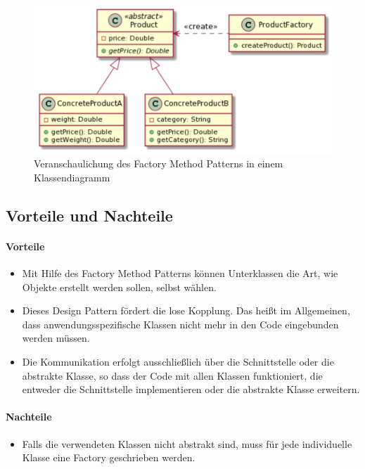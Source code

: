 \begin{figure}[H]
\begin{center}
	\includegraphics[scale=.7]{images/cld_factory_pattern.png}
\end{center}
	\caption{Veranschaulichung des Factory Method Patterns in einem Klassendiagramm}
\end{figure}

\subsection{Vorteile und Nachteile}
\paragraph{Vorteile}

\begin{itemize}
	\item Mit Hilfe des Factory Method Patterns können Unterklassen die Art, wie Objekte erstellt werden sollen, selbst wählen.
	\item Dieses Design Pattern fördert die lose Kopplung. Das heißt im Allgemeinen, dass anwendungsspezifische Klassen 			nicht mehr in den Code eingebunden werden müssen. 
	\item Die Kommunikation erfolgt ausschließlich über die Schnittstelle oder die abstrakte Klasse, so dass der Code mit allen 		Klassen funktioniert, die entweder die Schnittstelle implementieren oder die abstrakte Klasse erweitern.
\end{itemize}

\paragraph{Nachteile}

\begin{itemize}
	\item Falls die verwendeten Klassen nicht abstrakt sind, muss für jede individuelle Klasse eine Factory geschrieben werden.
\end{itemize}

